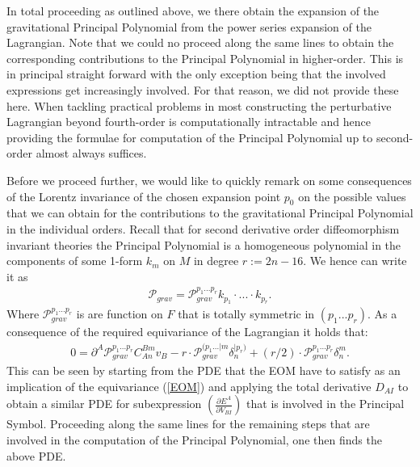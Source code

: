 \documentclass[a4paper,12pt, DIV=14, BCOR=5mm, twoside, headsepline, numbers=noenddot]{scrbook}
\begin{document}
In total proceeding as outlined above, we there obtain the expansion of the gravitational Principal Polynomial from the power series expansion of the Lagrangian.
Note that we could no proceed along the same lines to obtain the corresponding contributions to the Principal Polynomial in higher-order. This is in principal straight forward with the only exception being that the involved expressions get increasingly involved. For that reason, we did not provide these here. When tackling practical problems in most constructing the perturbative Lagrangian beyond fourth-order is computationally intractable and hence providing the formulae for computation of the Principal Polynomial up to second-order almost always suffices.

Before we proceed further, we would like to quickly remark on some consequences of the Lorentz invariance of the chosen expansion point $p_0$ on the possible values that we can obtain for the contributions to the gravitational Principal Polynomial in the individual orders. Recall that for second derivative order diffeomorphism invariant theories the Principal Polynomial is a homogeneous polynomial in the components of some 1-form $k_m$ on $M$ in degree $r := 2n-16$. We hence can write it as 
\begin{align}
    \mathcal{P}_{grav} = \mathcal{P}_{grav}^{{p_1}...{p_{r}}} k_{p_1} \cdot ... \cdot k_{p_r}.
\end{align}
Where $\mathcal{P}_{grav}^{{p_1}...{p_r}}$ is are function on $F$ that is totally symmetric in $(p_1...p_r)$. As a consequence of the required equivariance of the Lagrangian it holds that:
\begin{align}\label{polyEqn}
    0 = \partial^A\mathcal{P}_{grav}^{{p_1}...{p_r}}C_{An}^{Bm}v_B - r \cdot \mathcal{P}_{grav}^{({p_1}...\vert m} \delta_{n}^{\vert p_r) }  + (r/2) \cdot \mathcal{P}_{grav}^{{p_1}...{p_r}} \delta^m_n.
\end{align}
%
%
%
This can be seen by starting from the PDE that the EOM have to satisfy as an implication of the equivariance (\ref{EOM}) and applying the total derivative $D_{AI}$ to obtain a similar PDE for subexpression $\left ( \frac{\partial E^A}{\partial V_{BI}} \right )$ that is involved in the Principal Symbol. Proceeding along the same lines for the remaining steps that are involved in the computation of the Principal Polynomial, one then finds the above PDE. 
\end{document}
